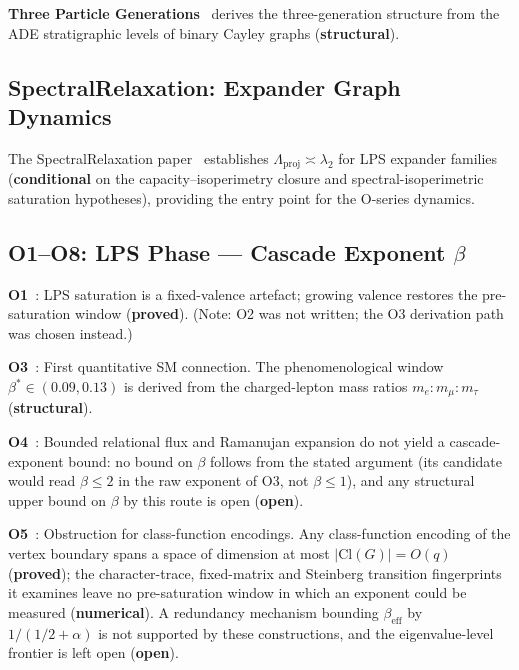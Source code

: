 \documentclass[11pt,a4paper]{article}
\newcommand{\sproved}{\textcolor{cproved}{\textbf{proved}}}
\newcommand{\sstruct}{\textcolor{cstruct}{\textbf{structural}}}
\newcommand{\sopen}{\textcolor{copen}{\textbf{open}}}
\newcommand{\snum}{\textcolor{cnum}{\textbf{numerical}}}
\newcommand{\scond}{\textcolor{ccond}{\textbf{conditional}}}
\begin{document}
    \textbf{Three Particle Generations}~\cite{Beau2026a4} derives the three-generation structure
    from the ADE stratigraphic levels of binary Cayley graphs (\sstruct).

  \subsection{SpectralRelaxation: Expander Graph Dynamics}

    The SpectralRelaxation paper~\cite{Beau2026a5} establishes $\Lambda_{\mathrm{proj}} \asymp \lambda_2$
    for LPS expander families (\scond{} on the capacity--isoperimetry closure and spectral-isoperimetric
    saturation hypotheses), providing the
    entry point for the O-series dynamics.

\subsection{O1--O8: LPS Phase --- Cascade Exponent \texorpdfstring{$\beta$}{beta}}

    \textbf{O1}~\cite{Beau2026a6}: LPS saturation is a fixed-valence artefact; growing valence restores
    the pre-saturation window (\sproved).
    (Note: O2 was not written; the O3 derivation path was chosen instead.)

    \textbf{O3}~\cite{Beau2026a7}: First quantitative SM connection.
    The phenomenological window $\beta^* \in (0.09, 0.13)$ is derived from the charged-lepton
    mass ratios $m_e : m_\mu : m_\tau$ (\sstruct).

    \textbf{O4}~\cite{Beau2026a8}: Bounded relational flux and Ramanujan expansion do not yield a
    cascade-exponent bound: no bound on $\beta$ follows from the stated argument (its candidate would
    read $\beta \leq 2$ in the raw exponent of O3, not $\beta \leq 1$), and any structural upper bound on
    $\beta$ by this route is open (\sopen).

    \textbf{O5}~\cite{Beau2026a9}: Obstruction for class-function encodings.
    Any class-function encoding of the vertex boundary spans a space of dimension at most
    $|\mathrm{Cl}(G)| = O(q)$ (\sproved); the character-trace, fixed-matrix and Steinberg transition
    fingerprints it examines leave no pre-saturation window in which an exponent could be measured
    (\snum).
    A redundancy mechanism bounding $\beta_{\mathrm{eff}}$ by $1/(1/2+\alpha)$ is not supported by these
    constructions, and the eigenvalue-level frontier is left open (\sopen).
\end{document}
